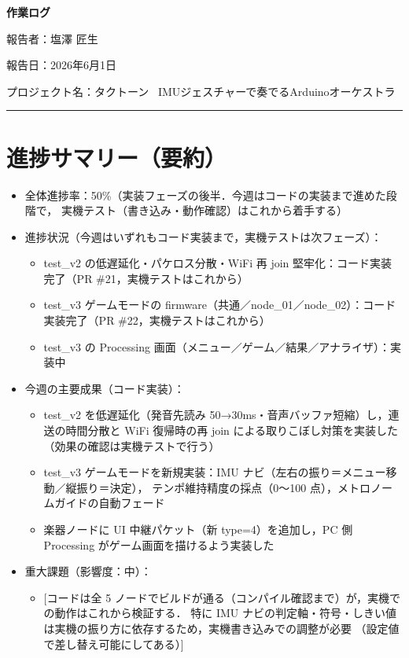 \documentclass[uplatex,dvipdfmx,a4paper,11pt]{jsarticle}
\newcommand{\sectionrule}{\par\medskip\noindent\rule{\linewidth}{0.6pt}\par\medskip}
\begin{document}
{\LARGE\bfseries 作業ログ}\par\bigskip

報告者：塩澤 匠生

報告日：2026年6月1日

プロジェクト名：タクトーン~ IMUジェスチャーで奏でるArduinoオーケストラ~ \\

\sectionrule

\section{進捗サマリー（要約）}

\begin{itemize}
  \item 全体進捗率：50\%（実装フェーズの後半．今週はコードの実装まで進めた段階で，
        実機テスト（書き込み・動作確認）はこれから着手する）
  \item 進捗状況（今週はいずれもコード実装まで，実機テストは次フェーズ）：
    \begin{itemize}
      \item test\_v2 の低遅延化・パケロス分散・WiFi 再 join 堅牢化：コード実装完了（PR \#21，実機テストはこれから）
      \item test\_v3 ゲームモードの firmware（共通／node\_01／node\_02）：コード実装完了（PR \#22，実機テストはこれから）
      \item test\_v3 の Processing 画面（メニュー／ゲーム／結果／アナライザ）：実装中
    \end{itemize}
  \item 今週の主要成果（コード実装）：
    \begin{itemize}
      \item test\_v2 を低遅延化（発音先読み 50→30ms・音声バッファ短縮）し，連送の時間分散と
            WiFi 復帰時の再 join による取りこぼし対策を実装した（効果の確認は実機テストで行う）
      \item test\_v3 ゲームモードを新規実装：IMU ナビ（左右の振り＝メニュー移動／縦振り＝決定），
            テンポ維持精度の採点（0〜100 点），メトロノームガイドの自動フェード
      \item 楽器ノードに UI 中継パケット（新 type=4）を追加し，PC 側 Processing がゲーム画面を描けるよう実装した
    \end{itemize}
  \item 重大課題（影響度：中）：
    \begin{itemize}
      \item {}[コードは全 5 ノードでビルドが通る（コンパイル確認まで）が，実機での動作はこれから検証する．
            特に IMU ナビの判定軸・符号・しきい値は実機の振り方に依存するため，実機書き込みでの調整が必要
            （設定値で差し替え可能にしてある）]
    \end{itemize}
\end{itemize}
\end{document}
